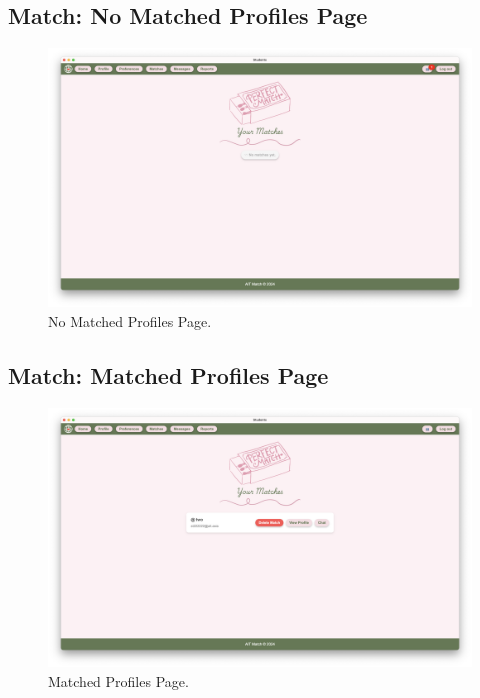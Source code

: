         \newpage
        \subsection{Match: No Matched Profiles Page}
        \begin{figure}[h]
                \centering
                \captionsetup{justification=centering, singlelinecheck=false, labelsep=space}
                \includegraphics[width=5in]{figures/results/matches/no-matched-profile-page.png} 
                \caption{No Matched Profiles Page.}
                \label{fig:no-matched-profile-page}
            \end{figure}

        \subsection{Match: Matched Profiles Page}
        \begin{figure}[h]
                \centering
                \captionsetup{justification=centering, singlelinecheck=false, labelsep=space}
                \includegraphics[width=5in]{figures/results/matches/matched-profile-page.png} 
                \caption{Matched Profiles Page.}
                \label{fig:matched-profile-page}
            \end{figure}
        \newpage
